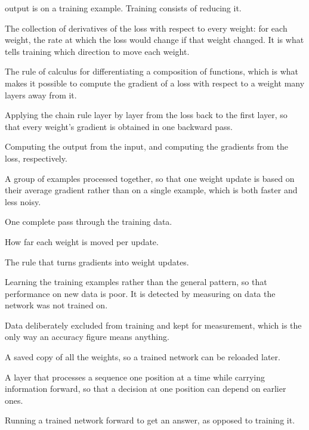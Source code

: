 \documentclass[11pt,a4paper,oneside]{report}
\begin{document}
\begin{description}[style=nextline,leftmargin=1.4em]
        output is on a training example. Training consists of reducing it.
  \item[Gradient] The collection of derivatives of the loss with respect to
        every weight: for each weight, the rate at which the loss would
        change if that weight changed. It is what tells training which
        direction to move each weight.
  \item[Chain rule] The rule of calculus for differentiating a composition of
        functions, which is what makes it possible to compute the gradient of
        a loss with respect to a weight many layers away from it.
  \item[Backpropagation] Applying the chain rule layer by layer from the loss
        back to the first layer, so that every weight's gradient is obtained
        in one backward pass.
  \item[Forward pass, backward pass] Computing the output from the input, and
        computing the gradients from the loss, respectively.
  \item[Batch] A group of examples processed together, so that one weight
        update is based on their average gradient rather than on a single
        example, which is both faster and less noisy.
  \item[Epoch] One complete pass through the training data.
  \item[Learning rate] How far each weight is moved per update.
  \item[Optimiser] The rule that turns gradients into weight updates.
  \item[Overfitting] Learning the training examples rather than the general
        pattern, so that performance on new data is poor. It is detected by
        measuring on data the network was not trained on.
  \item[Holdout, or validation set] Data deliberately excluded from training
        and kept for measurement, which is the only way an accuracy figure
        means anything.
  \item[Checkpoint] A saved copy of all the weights, so a trained network can
        be reloaded later.
  \item[Recurrent layer] A layer that processes a sequence one position at a
        time while carrying information forward, so that a decision at one
        position can depend on earlier ones.
  \item[Inference] Running a trained network forward to get an answer, as
        opposed to training it.
\end{description}
\end{document}
